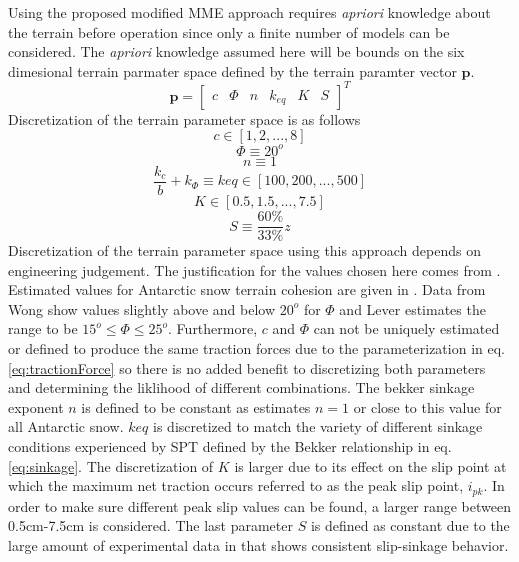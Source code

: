 Using the proposed modified MME approach requires \textit{apriori} knowledge about the terrain before operation since only a finite number of models can be considered. The \textit{apriori} knowledge assumed here will be bounds on the six dimesional terrain parmater space defined by the terrain paramter vector $\mathbf{p}$.
\begin{equation*}
    \mathbf{p} = \begin{bmatrix} c & \Phi & n & k_{eq} & K & S \end{bmatrix}^T
\end{equation*}
Discretization of the terrain parameter space is as follows
\begin{equation*}
    c \in [1,2,...,8]    
\end{equation*}
\begin{equation*}
    \Phi \equiv 20^o
\end{equation*}
\begin{equation*}
    n \equiv 1
\end{equation*}
\begin{equation*}
    \frac{k_c}{b} + k_{\Phi} \equiv keq \in [100,200,...,500]    
\end{equation*}
\begin{equation*}
    K \in [0.5,1.5,...,7.5]
\end{equation*}
\begin{equation*}
    S \equiv \frac{60\%}{33\%}z
\end{equation*}
Discretization of the terrain parameter space using this approach depends on engineering judgement. The justification for the values chosen here comes from \cite{Wong2008,lyasko2010slip,lever2006solar,wong2009OffRoad}. Estimated values for Antarctic snow terrain cohesion are given in \cite{lever2012high}. Data from Wong \cite{Wong2008,wong2009OffRoad} show values slightly above and below $20^o$ for $\Phi$ and Lever estimates the range to be $15^o \leq \Phi \leq 25^o$. Furthermore, $c$ and $\Phi$ can not be uniquely estimated or defined to produce the same traction forces due to the parameterization in eq. \ref{eq:tractionForce} so there is no added benefit to discretizing both parameters and determining the liklihood of different combinations. The bekker sinkage exponent $n$ is defined to be constant as \cite{lever2006solar} estimates $n=1$ or close to this value for all Antarctic snow. $keq$ is discretized to match the variety of different sinkage conditions experienced by SPT defined by the Bekker relationship in eq. \ref{eq:sinkage}. The discretization of $K$ is larger due to its effect on the slip point at which the maximum net traction occurs referred to as the peak slip point, $i_{pk}$. In order to make sure different peak slip values can be found, a larger range between 0.5cm-7.5cm is considered. The last parameter $S$ is defined as constant due to the large amount of experimental data in \cite{lyasko2010slip} that shows consistent slip-sinkage behavior.

